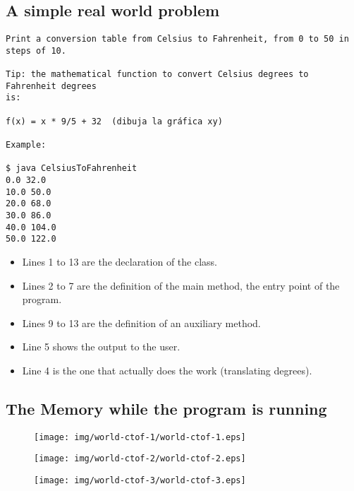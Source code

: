 \documentclass[8pt, a4paper, oneside]{extarticle}
\begin{document}
\subsection{A simple real world problem}

\begin{Verbatim}
Print a conversion table from Celsius to Fahrenheit, from 0 to 50 in steps of 10.

Tip: the mathematical function to convert Celsius degrees to Fahrenheit degrees
is:

f(x) = x * 9/5 + 32  (dibuja la gráfica xy)

Example:

$ java CelsiusToFahrenheit
0.0 32.0
10.0 50.0
20.0 68.0
30.0 86.0
40.0 104.0
50.0 122.0
\end{Verbatim}

\begin{multicols}{2}
\columnbreak

\begin{itemize}

  \item Lines 1 to 13 are the declaration of the class.

  \item Lines 2 to 7 are the definition of the main method, the entry point of
    the program.

  \item Lines 9 to 13 are the definition of an auxiliary method.

  \item Line 5 shows the output to the user.

  \item Line 4 is the one that actually does the work (translating degrees).

\end{itemize}

\end{multicols}

\subsection{The Memory while the program is running}

\begin{figure}[!ht]
  \centering
  \texttt{[image: img/world-ctof-1/world-ctof-1.eps]}
\end{figure}
\begin{figure}[!ht]
  \centering
  \texttt{[image: img/world-ctof-2/world-ctof-2.eps]}
\end{figure}
\begin{figure}[!ht]
  \centering
  \texttt{[image: img/world-ctof-3/world-ctof-3.eps]}
\end{figure}
\end{document}
